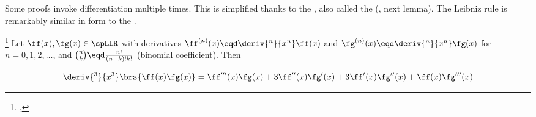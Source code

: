 Some proofs invoke differentiation multiple times.
This is simplified thanks to the , also called the 
 (, next lemma).
The Leibniz rule is remarkably similar in form to the .
\begin{lemma}[Leibniz rule]
\footnote{
  ,
  }
\label{lem:LGPR}
Let $\ff(x),\fg(x)\in\spLLR$ with derivatives
$\ff^{(n)}(x)\eqd\deriv{^n}{x^n}\ff(x)$ and
$\fg^{(n)}(x)\eqd\deriv{^n}{x^n}\fg(x)$ for $n=0,1,2,\ldots$,
and ${n\choose k}\eqd\frac{n!}{(n-k)!k!}$ (binomial coefficient).
Then
\end{lemma}


\begin{example}
\[\deriv{^3}{x^3}\brs{\ff(x)\fg(x)} = \ff'''(x)\fg(x) + 3\ff''(x)\fg'(x) + 3\ff'(x)\fg''(x) + \ff(x)\fg'''(x)\]
\end{example}










